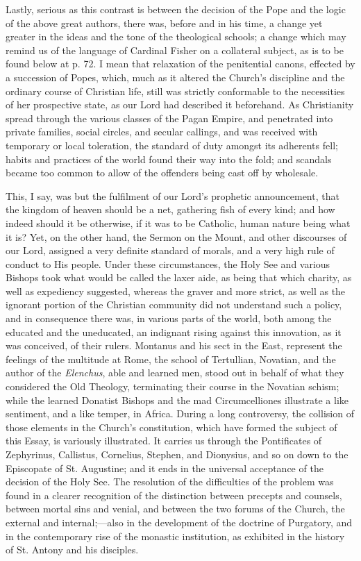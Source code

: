 Lastly, serious as this contrast is between the decision of the
Pope and the logic of the above great authors, there was, before and
in his time, a change yet greater in the ideas and the tone of the
theological schools; a change which may remind us of the language of
Cardinal Fisher on a collateral subject, as is to be found below at p.
72. I mean that relaxation of the penitential canons, effected by a
succession of Popes, which, much as it altered the Church's discipline
and the ordinary course of Christian life, still was strictly
conformable to the necessities of her prospective state, as our Lord
had described it beforehand. As Christianity spread through the
various classes of the Pagan Empire, and penetrated into
private families, social circles, and secular callings, and was
received with temporary or local toleration, the standard of duty
amongst its adherents fell; habits and practices of the world found
their way into the fold; and scandals became too common to allow of
the offenders being cast off by wholesale.

This, I say, was but the fulfilment of our Lord's prophetic
announcement, that the kingdom of heaven should be a net, gathering
fish of every kind; and how indeed should it be otherwise, if it was
to be Catholic, human nature being what it is? Yet, on the other hand,
the Sermon on the Mount, and other discourses of our Lord, assigned a
very definite standard of morals, and a very high rule of conduct to
His people. Under these circumstances, the Holy See and various
Bishops took what would be called the laxer aide, as being that which
charity, as well as expediency suggested, whereas the graver and more
strict, as well as the ignorant portion of the Christian community did
not understand such a policy, and in consequence there was, in various
parts of the world, both among the educated and the uneducated, an
indignant rising against this innovation, as it was conceived, of
their rulers. Montanus and his sect in the East, represent the
feelings of the multitude at Rome, the school of Tertullian, Novatian, and the author of the \emph{Elenchus}, able and learned men, stood
out in behalf of what they considered the Old Theology, terminating
their course in the Novatian schism; while the learned Donatist
Bishops and the mad Circumcelliones illustrate a like sentiment, and a
like temper, in Africa. During a long controversy, the collision of
those elements in the Church's constitution, which have formed the
subject of this Essay, is variously illustrated. It carries us through
the Pontificates of Zephyrinus, Callistus, Cornelius, Stephen, and
Dionysius, and so on down to the Episcopate of St. Augustine; and it
ends in the universal acceptance of the decision of the Holy See. The
resolution of the difficulties of the problem was found in a clearer
recognition of the distinction between precepts and counsels, between
mortal sins and venial, and between the two forums of the Church, the
external and internal;—also in the development of the doctrine of
Purgatory, and in the contemporary rise of the monastic institution,
as exhibited in the history of St. Antony and his disciples.

